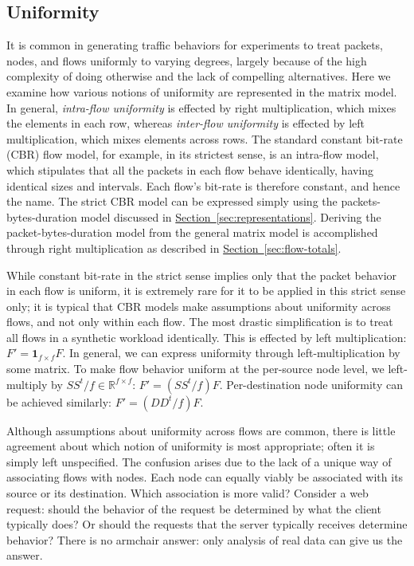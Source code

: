 \documentclass[conference]{IEEEtran}
\newcommand{\caps}[1]{{\small{#1}}}
\newcommand{\Section}[1]{\hyperref[sec:#1]{Section~\ref*{sec:#1}}}
\newcommand{\R}{\mathbb{R}}
\newcommand{\ones}[1]{\mathbf{1}_{#1}}
\begin{document}
\subsection{Uniformity}

It is common in generating traffic behaviors for experiments to treat packets, nodes, and flows uniformly to varying degrees, largely because of the high complexity of doing otherwise and the lack of compelling alternatives. Here we examine how various notions of uniformity are represented in the matrix model. In general, \textit{intra-flow uniformity} is effected by right multiplication, which mixes the elements in each row, whereas \textit{inter-flow uniformity} is effected by left multiplication, which mixes elements across rows. The standard constant bit-rate (\caps{CBR}) flow model, for example, in its strictest sense, is an intra-flow model, which stipulates that all the packets in each flow behave identically, having identical sizes and intervals. Each flow's bit-rate is therefore constant, and hence the name. The strict \caps{CBR} model can be expressed simply using the packets-bytes-duration model discussed in \Section{representations}. Deriving the packet-bytes-duration model from the general matrix model is accomplished through right multiplication as described in \Section{flow-totals}.

While constant bit-rate in the strict sense implies only that the packet behavior in each flow is uniform, it is extremely rare for it to be applied in this strict sense only; it is typical that \caps{CBR} models make assumptions about uniformity across flows, and not only within each flow. The most drastic simplification is to treat all flows in a synthetic workload identically. This is effected by left multiplication: $F'=\ones{f \times f} F$. In general, we can express uniformity through left-multiplication by some matrix. To make flow behavior uniform at the per-source node level, we left-multiply by $SS^t/f\in\R^{f \times f}$: $F'=(SS^t/f)F$. Per-destination node uniformity can be achieved similarly: $F'=(DD^t/f)F$.

Although assumptions about uniformity across flows are common, there is little agreement about which notion of uniformity is most appropriate; often it is simply left unspecified. The confusion arises due to the lack of a unique way of associating flows with nodes. Each node can equally viably be associated with its source or its destination. Which association is more valid? Consider a web request: should the behavior of the request be determined by what the client typically does? Or should the requests that the server typically receives determine behavior? There is no armchair answer: only analysis of real data can give us the answer.
\end{document}
